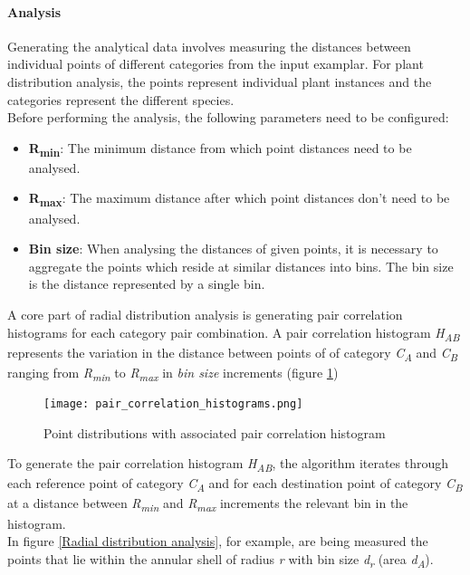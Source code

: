 \paragraph{Analysis}
Generating the analytical data involves measuring the distances between individual points of different categories from the input examplar. For plant distribution analysis, the points represent individual plant instances and the categories represent the different species.\\

Before performing the analysis, the following parameters need to be configured:
\begin{itemize}
\item \textbf{R\textsubscript{min}}: The minimum distance from which point distances need to be analysed.\\
\item \textbf{R\textsubscript{max}}: The maximum distance after which point distances don't need to be analysed.\\
\item \textbf{Bin size}: When analysing the distances of given points, it is necessary to aggregate the points which reside at similar distances into bins. The bin size is the distance represented by a single bin.\\
\end{itemize}

A core part of radial distribution analysis is generating pair correlation histograms for each category pair combination. A pair correlation histogram \textit{H\textsubscript{AB}} represents the variation in the distance between points of of category \textit{C\textsubscript{A}} and \textit{C\textsubscript{B}} ranging from \textit{R\textsubscript{min}} to \textit{R\textsubscript{max}} in \textit{bin size} increments (figure \ref{Pair Correlation Histograms}) \\

\begin{figure}[h]
  \centering
	\label{Pair Correlation Histograms}
	\texttt{[image: pair\_correlation\_histograms.png]}
	\caption{Point distributions with associated pair correlation histogram \cite{Emilien2014}}
\end{figure}

To generate the pair correlation histogram \textit{H\textsubscript{AB}}, the algorithm iterates through each reference point of category \textit{C\textsubscript{A}} and for each destination point of category \textit{C\textsubscript{B}} at a distance between \textit{R\textsubscript{min}} and \textit{R\textsubscript{max}} increments the relevant bin in the histogram.\\
In figure \ref{Radial distribution analysis}, for example, are being measured the points that lie within the annular shell of radius \textit{r} with bin size \textit{d\textsubscript{r}} (area \textit{d\textsubscript{A}}). 

